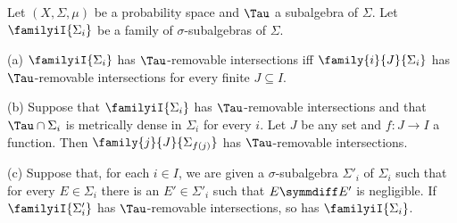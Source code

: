 Let $(X,\Sigma,\mu)$ be a probability space and $\Tau$ a
subalgebra of $\Sigma$.   Let $\familyiI{\Sigma_i}$ be a family of
$\sigma$-subalgebras of $\Sigma$.

(a) $\familyiI{\Sigma_i}$
has $\Tau$-removable intersections iff $\family{i}{J}{\Sigma_i}$ has
$\Tau$-removable intersections for every finite $J\subseteq I$.

(b) Suppose that $\familyiI{\Sigma_i}$ has $\Tau$-removable intersections
and that $\Tau\cap\Sigma_i$ is metrically dense in $\Sigma_i$ for every
$i$.   Let $J$ be any set and $f:J\to I$ a function.   Then
$\family{j}{J}{\Sigma_{f(j)}}$ has $\Tau$-removable intersections.

(c) Suppose that, for each $i\in I$, we are given a $\sigma$-subalgebra
$\Sigma'_i$ of $\Sigma_i$ such that for every $E\in\Sigma_i$ there is an
$E'\in\Sigma'_i$ such that $E\symmdiff E'$ is negligible.   If
$\familyiI{\Sigma'_i}$ has $\Tau$-removable intersections,
so has $\familyiI{\Sigma_i}$.

